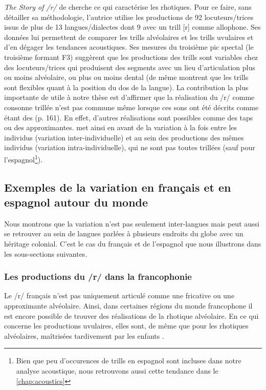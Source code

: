 \textit{The Story of /r/} de \textcite{lindauStory1985} cherche ce qui caractérise les rhotiques. Pour ce faire, sans détailler sa méthodologie, l'autrice utilise les productions de 92 locuteurs/trices issus de plus de 13 langues/dialectes dont 9 avec un trill [r] comme allophone. Ses données lui permettent de comparer les trills alvéolaires et les trills uvulaires  et d'en dégager les tendances acoustiques. Ses mesures du troisième pic spectal (le troisième formant F3) suggèrent que les productions des trills sont variables chez des locuteurs/trices qui produisent des segments avec un lieu d'articulation plus ou moins alvéolaire, ou plus ou moins dental (de même \textcite{dhananjayaAcousticAnalysisTrill2012} montrent que les trills sont flexibles quant à la position du dos de la langue). La contribution la plus importante de \citeauthor{lindauStory1985} utile à notre thèse est d'affirmer que la réalisation du /r/ comme consonne trillée n'est pas commune même lorsque ces sons ont été décrits comme étant des  (p. 161). En effet, d'autres réalisations sont possibles comme des taps ou des approximantes. \citeauthor{lindauStory1985} met ainsi en avant de la variation à la fois entre les individus (variation inter-individuelle) et au sein des productions des mêmes individus (variation intra-individuelle), qui ne sont pas toutes trillées (sauf pour l'espagnol\footnote{Bien que peu d'occurences de trills en espagnol sont incluses dans notre analyse acoustique, nous retrouvons aussi cette tendance dans le \autoref{chap:acoustics}}).\\
	

\subsection{Exemples de la variation en français et en espagnol autour du monde}

Nous montrons que la variation n'est pas seulement inter-langues mais peut aussi se retrouver au sein de langues parlées à plusieurs endroits du globe avec un héritage colonial. C'est le cas du français et de l'espagnol que nous illustrons dans les sous-sections suivantes.

\subsubsection{Les productions du /r/ dans la francophonie}

Le /r/ français n'est pas uniquement articulé comme une fricative ou une approximante alvéolaire. Ainsi, dans certaines régions du monde francophone il est encore possible de trouver des réalisations de la rhotique alvéolaire. En ce qui concerne les productions uvulaires, elles sont, de même que pour les rhotiques alvéolaires, maîtrisées tardivement par les enfants \parencite{dossantosDeveloppementPhonologiqueFrancais2007,metralCaracterisationAcoustiqueRhotique2021}.\\

